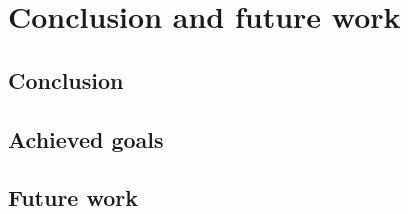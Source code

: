 \chapter{Conclusion and future work}

\section{Conclusion}

\section{Achieved goals}

\section{Future work}